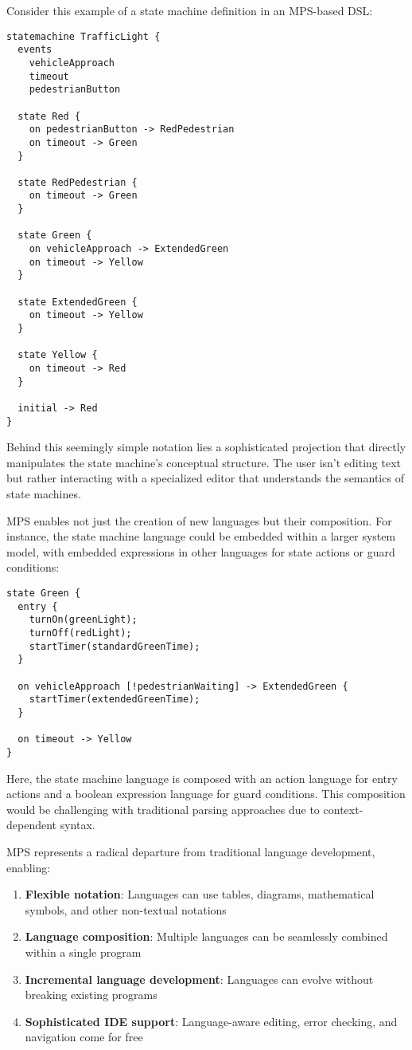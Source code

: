 \documentclass[11pt]{article}
\begin{document}
Consider this example of a state machine definition in an MPS-based DSL:

\begin{verbatim}
statemachine TrafficLight {
  events
    vehicleApproach
    timeout
    pedestrianButton

  state Red {
    on pedestrianButton -> RedPedestrian
    on timeout -> Green
  }

  state RedPedestrian {
    on timeout -> Green
  }

  state Green {
    on vehicleApproach -> ExtendedGreen
    on timeout -> Yellow
  }

  state ExtendedGreen {
    on timeout -> Yellow
  }

  state Yellow {
    on timeout -> Red
  }

  initial -> Red
}
\end{verbatim}

Behind this seemingly simple notation lies a sophisticated projection that directly manipulates the state machine's conceptual structure. The user isn't editing text but rather interacting with a specialized editor that understands the semantics of state machines.

MPS enables not just the creation of new languages but their composition. For instance, the state machine language could be embedded within a larger system model, with embedded expressions in other languages for state actions or guard conditions:

\begin{verbatim}
state Green {
  entry {
    turnOn(greenLight);
    turnOff(redLight);
    startTimer(standardGreenTime);
  }

  on vehicleApproach [!pedestrianWaiting] -> ExtendedGreen {
    startTimer(extendedGreenTime);
  }

  on timeout -> Yellow
}
\end{verbatim}

Here, the state machine language is composed with an action language for entry actions and a boolean expression language for guard conditions. This composition would be challenging with traditional parsing approaches due to context-dependent syntax.

MPS represents a radical departure from traditional language development, enabling:

\begin{enumerate}
\item \textbf{Flexible notation}: Languages can use tables, diagrams, mathematical symbols, and other non-textual notations
\item \textbf{Language composition}: Multiple languages can be seamlessly combined within a single program
\item \textbf{Incremental language development}: Languages can evolve without breaking existing programs
\item \textbf{Sophisticated IDE support}: Language-aware editing, error checking, and navigation come for free
\end{enumerate}
\end{document}
